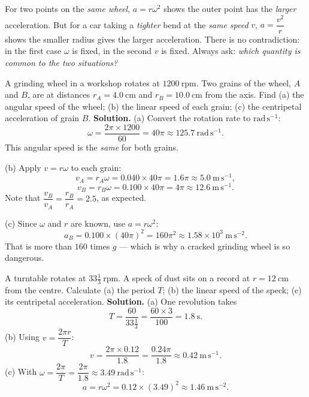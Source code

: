 \documentclass[11pt]{article}
\newcounter{popsec}
\newcounter{popsub}
\newcommand{\courssub}[1]{%
  \stepcounter{popsub}%
  \par\vspace{9pt}\noindent{\popxbold\fontsize{11.5}{13}\selectfont\color{popink}{\color{poporange}\thepopsec.\thepopsub}\hspace{6pt}#1}\par\nopagebreak\vspace{4pt}
}
\begin{document}
\begin{attention}
For two points on the \emph{same wheel}, $a = r\omega^{2}$ shows the outer point has the \emph{larger} acceleration. But for a car taking a \emph{tighter} bend at the \emph{same speed} $v$, $a = \dfrac{v^{2}}{r}$ shows the smaller radius gives the larger acceleration. There is no contradiction: in the first case $\omega$ is fixed, in the second $v$ is fixed. Always ask: \emph{which quantity is common to the two situations?}
\end{attention}

\courssub{Worked Examples}

\begin{exoresolu}
A grinding wheel in a workshop rotates at $1200\ \mathrm{rpm}$. Two grains of the wheel, $A$ and $B$, are at distances $r_A = 4.0\ \mathrm{cm}$ and $r_B = 10.0\ \mathrm{cm}$ from the axis. Find (a) the angular speed of the wheel; (b) the linear speed of each grain; (c) the centripetal acceleration of grain $B$.
\tcblower
\textbf{Solution.}
(a) Convert the rotation rate to $\mathrm{rad\,s^{-1}}$:
\[ \omega = \frac{2\pi \times 1200}{60} = 40\pi \approx 125.7\ \mathrm{rad\,s^{-1}}. \]
This angular speed is the \emph{same} for both grains.

(b) Apply $v = r\omega$ to each grain:
\[ v_A = r_A\omega = 0.040 \times 40\pi = 1.6\pi \approx 5.0\ \mathrm{m\,s^{-1}}, \]
\[ v_B = r_B\omega = 0.100 \times 40\pi = 4\pi \approx 12.6\ \mathrm{m\,s^{-1}}. \]
Note that $\dfrac{v_B}{v_A} = \dfrac{r_B}{r_A} = 2.5$, as expected.

(c) Since $\omega$ and $r$ are known, use $a = r\omega^{2}$:
\[ a_B = 0.100 \times (40\pi)^{2} = 160\pi^{2} \approx 1.58\times 10^{3}\ \mathrm{m\,s^{-2}}. \]
That is more than $160$ times $g$ --- which is why a cracked grinding wheel is so dangerous.
\end{exoresolu}

\begin{exoresolu}
A turntable rotates at $33\frac{1}{3}\ \mathrm{rpm}$. A speck of dust sits on a record at $r = 12\ \mathrm{cm}$ from the centre. Calculate (a) the period $T$; (b) the linear speed of the speck; (c) its centripetal acceleration.
\tcblower
\textbf{Solution.}
(a) One revolution takes
\[ T = \frac{60}{33\tfrac{1}{3}} = \frac{60 \times 3}{100} = 1.8\ \mathrm{s}. \]
(b) Using $v = \dfrac{2\pi r}{T}$:
\[ v = \frac{2\pi \times 0.12}{1.8} = \frac{0.24\pi}{1.8} \approx 0.42\ \mathrm{m\,s^{-1}}. \]
(c) With $\omega = \dfrac{2\pi}{T} = \dfrac{2\pi}{1.8} \approx 3.49\ \mathrm{rad\,s^{-1}}$:
\[ a = r\omega^{2} = 0.12 \times (3.49)^{2} \approx 1.46\ \mathrm{m\,s^{-2}}. \]
\end{exoresolu}
\end{document}
